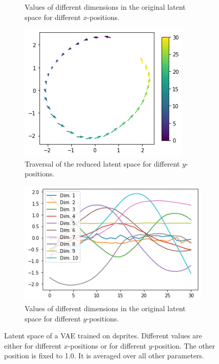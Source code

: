 \begin{figure}
\begin{subfigure}{.48\textwidth}
        \caption{Values of different dimensions in the original latent space for different $x$-positions.}
        \label{subfig:vae_dsprites_x_pos_dim_values}
    \end{subfigure}
    \begin{subfigure}{.48\textwidth}
        \includegraphics[width=\textwidth]{images/latent_space_traversals/vae_dsprites_position_latent_space_route_y.png}
        \caption{Traversal of the reduced latent space for different $y$-positions.}
        \label{subfig:vae_dsprites_y_pos_latent_space_route}
    \end{subfigure}
    \hfill
    \begin{subfigure}{.48\textwidth}
        \includegraphics[width=\textwidth]{images/latent_space_traversals/vae_dsprites_position_latent_space_values_y.png}
        \caption{Values of different dimensions in the original latent space for different $y$-positions.}
        \label{subfig:vae_dsprites_y_pos_dim_values}
    \end{subfigure}
    \caption{Latent space of a \ac{VAE} trained on dsprites. Different values are either for different $x$-positions or for different $y$-position. The other position is fixed to 1.0. It is averaged over all other parameters.}
    \label{fig:vae_dsprites_latent_space_x_position}
\end{figure}

